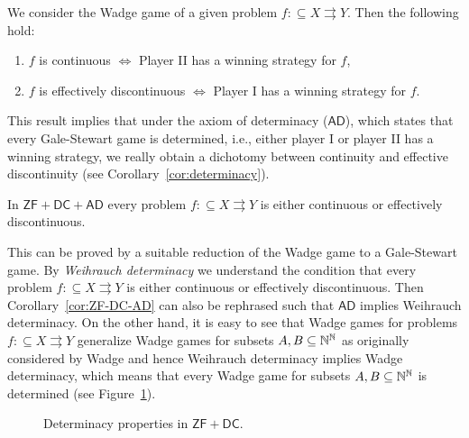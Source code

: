 \documentclass{amsart}
\def\IN{{\Bbb{N}}}
\def\In{\subseteq}
\def\mto{\rightrightarrows}
\def\AD{\mathsf{AD}}
\def\ZF{\mathsf{ZF}}
\def\DC{\mathsf{DC}}
\begin{document}
\begin{theorem}
We consider the Wadge game of a given problem ${f:\In X\mto Y}$.
Then the following hold:
\begin{enumerate}
\item $f$ is continuous $\iff$ Player II has a winning strategy for $f$,
\item $f$ is effectively discontinuous $\iff$ Player I has a winning strategy for $f$.
\end{enumerate}
\end{theorem}

This result implies that under the axiom of determinacy ($\AD$), which states that every Gale-Stewart game is determined, i.e., either player I or player II has a winning strategy, we really obtain a dichotomy between continuity and effective discontinuity
(see Corollary~\ref{cor:determinacy}).

\begin{corollary}
\label{cor:ZF-DC-AD}
In $\ZF+\DC+\AD$ every problem $f:\In X\mto Y$ is either continuous or effectively discontinuous.
\end{corollary}

This can be proved by a suitable reduction of the Wadge game to a Gale-Stewart game.
By {\em Weihrauch determinacy} we understand the condition that every problem $f:\In X\mto Y$ is either continuous or effectively discontinuous. Then Corollary~\ref{cor:ZF-DC-AD} can also be rephrased such that $\AD$ implies Weihrauch determinacy. On the other hand, it is easy to see that Wadge games for problems $f:\In X\mto Y$ generalize Wadge
games for subsets $A,B\In\IN^\IN$ as originally considered by Wadge and hence Weihrauch determinacy implies 
Wadge determinacy, which means that every Wadge game for subsets $A,B\In\IN^\IN$ is determined (see Figure~\ref{fig:determinacy}).

\begin{figure}[thb]
\caption{Determinacy properties in $\ZF+\DC$.} 
\label{fig:determinacy}
\end{figure}
\end{document}
